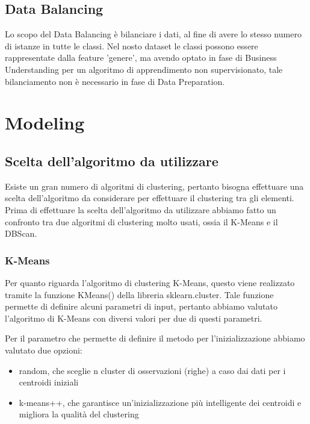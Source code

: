 \documentclass[a4paper, 10pt]{report}
\begin{document}
        \section{Data Balancing}\label{sec:data-balancing}
            Lo scopo del Data Balancing è bilanciare i dati, al fine di avere lo stesso numero di istanze in tutte le classi.
            Nel nosto dataset le classi possono essere rappresentate dalla feature 'genere', ma avendo optato in fase di
            Business Understanding per un algoritmo di apprendimento non supervisionato, tale bilanciamento non è necessario
            in fase di Data Preparation.


    \chapter{Modeling}\label{ch:modeling}

        \section{Scelta dell'algoritmo da utilizzare}\label{sec:scelta-dell'algoritmo-da-utilizzare}
            Esiste un gran numero di algoritmi di clustering, pertanto bisogna effettuare una scelta dell'algoritmo da considerare
            per effettuare il clustering tra gli elementi.
            Prima di effettuare la scelta dell'algoritmo da utilizzare abbiamo fatto un confronto tra due algoritmi di clustering molto
            usati, ossia il K-Means e il DBScan.

            \subsection{K-Means}
                Per quanto riguarda l'algoritmo di clustering K-Means, questo viene realizzato tramite la funzione KMeans()
                della libreria sklearn.cluster.
                Tale funzione permette di definire alcuni parametri di input, pertanto abbiamo valutato l'algoritmo di K-Means
                con diversi valori per due di questi parametri.

                Per il parametro che permette di definire il metodo per l'inizializzazione abbiamo valutato due opzioni:
                    \begin{itemize}
                        \item random, che sceglie n cluster di osservazioni (righe) a caso dai dati per i centroidi iniziali
                        \item k-means++, che garantisce un'inizializzazione più intelligente dei centroidi e migliora la qualità del clustering
                    \end{itemize}
\end{document}
